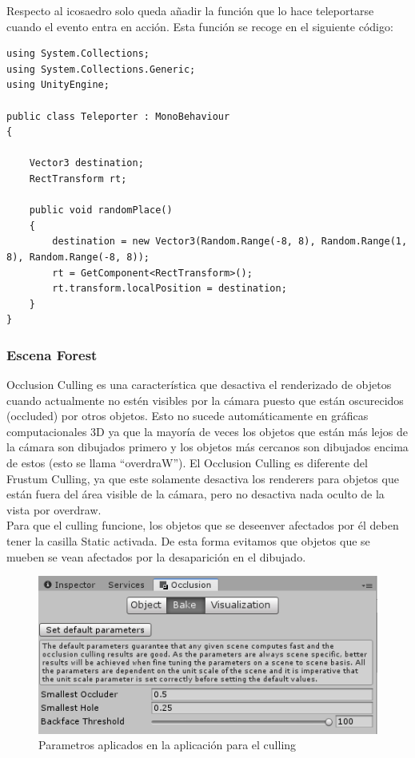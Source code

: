 
\quad Respecto al icosaedro solo queda añadir la función que lo hace teleportarse cuando el evento entra en acción. Esta función se recoge en el siguiente código:\\

\lstset{language=[sharp]C, breaklines=true, basicstyle=\footnotesize}
\begin{lstlisting}[frame=single, caption={Teleporter.cs}]
using System.Collections;
using System.Collections.Generic;
using UnityEngine;

public class Teleporter : MonoBehaviour
{

    Vector3 destination;
    RectTransform rt;
    
    public void randomPlace()
    {
        destination = new Vector3(Random.Range(-8, 8), Random.Range(1, 8), Random.Range(-8, 8));
        rt = GetComponent<RectTransform>();
        rt.transform.localPosition = destination;
    }
}
\end{lstlisting}

	\subsubsection{Escena Forest}
\quad Occlusion Culling es una característica que desactiva el renderizado de objetos cuando actualmente no estén visibles por la cámara puesto que están oscurecidos (occluded) por otros objetos. Esto no sucede automáticamente en gráficas computacionales 3D ya que la mayoría de veces los objetos que están más lejos de la cámara son dibujados primero y los objetos más cercanos son dibujados encima de estos (esto se llama “overdraW”). El Occlusion Culling es diferente del Frustum Culling, ya que este solamente desactiva los renderers para objetos que están fuera del área visible de la cámara, pero no desactiva nada oculto de la vista por overdraw.\\

\quad Para que el culling funcione, los objetos que se deseenver afectados por él deben tener la casilla Static activada. De esta forma evitamos que objetos que se mueben se vean afectados por la desaparición en el dibujado.\\

\begin{figure}[htb]
	\centering
	\includegraphics[width=1\textwidth]{./imagenes/cullingdata}
	\caption{Parametros aplicados en la aplicación para el culling}
\end{figure}


